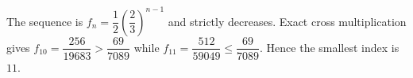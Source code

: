 The sequence is $f_n=\dfrac{1}{2}(\dfrac{2}{3})^{n-1}$ and strictly decreases. Exact cross multiplication gives $f_{10}=\dfrac{256}{19683}>\dfrac{69}{7089}$ while $f_{11}=\dfrac{512}{59049}\le\dfrac{69}{7089}$. Hence the smallest index is $\boxed{11}$.

